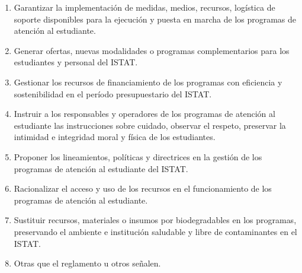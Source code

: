 \begin{enumerate}
\item Garantizar la implementación de medidas, medios, recursos, logística de soporte disponibles para la ejecución y puesta en marcha de los programas de atención al estudiante. 
\item Generar ofertas, nuevas modalidades o programas complementarios para los estudiantes y personal del ISTAT. 
\item Gestionar los recursos de financiamiento de los programas con eficiencia y sostenibilidad en el período presupuestario del ISTAT. 
\item Instruir a los responsables y operadores de los programas de atención al estudiante las instrucciones sobre cuidado, observar el respeto, preservar la intimidad e integridad moral y física de los estudiantes. 
\item Proponer los lineamientos, políticas y directrices en la gestión de los programas de atención al estudiante del ISTAT. 
\item Racionalizar el acceso y uso de los recursos en el funcionamiento de los programas de atención al estudiante. 
\item Sustituir recursos, materiales o insumos por biodegradables en los programas, preservando el ambiente e institución saludable y libre de contaminantes en el ISTAT. 
\item Otras que el reglamento u otros señalen. 
\end{enumerate}
